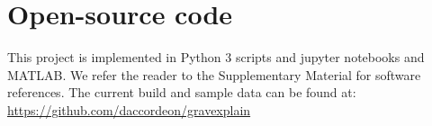 \documentclass[paper-main.tex]{subfiles}
\begin{document}
\section{Open-source code}
\label{app:code}
This project is implemented in Python 3 scripts and jupyter notebooks and MATLAB. 
We refer the reader to the Supplementary Material for software references. 
The current build and sample data can be found at:
\url{https://github.com/daccordeon/gravexplain}
\end{document}
